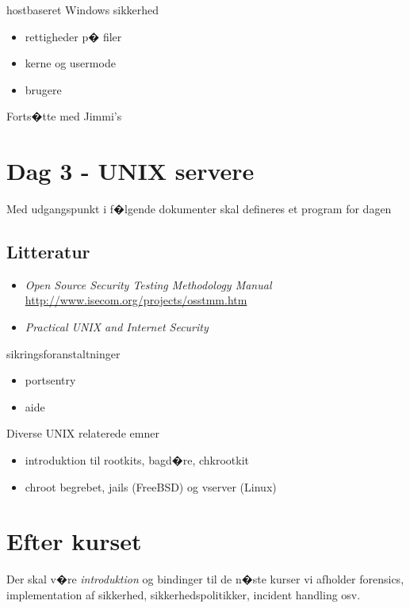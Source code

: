 \documentclass[a4paper,12pt]{article}
\newcommand{\link}[1]{\href{#1}{#1}}
\begin{document}
hostbaseret Windows sikkerhed
\begin{itemize}
\item rettigheder p� filer
\item kerne og usermode
\item brugere
\end{itemize}

Forts�tte med Jimmi's



\section{Dag 3 - UNIX servere}

Med udgangspunkt i f�lgende dokumenter skal defineres et program for
dagen
\subsection{Litteratur}
\begin{itemize}
\item
\emph{Open Source Security Testing Methodology Manual}\\
\link{http://www.isecom.org/projects/osstmm.htm}
\item \emph{Practical UNIX and Internet Security}
\end{itemize}

sikringsforanstaltninger
\begin{itemize}
\item portsentry
\item aide
\end{itemize}

Diverse UNIX relaterede emner
\begin{itemize}
\item introduktion til rootkits, bagd�re, chkrootkit
\item chroot begrebet, jails (FreeBSD) og vserver (Linux)
\end{itemize}

\section{Efter kurset}
Der skal v�re \emph{introduktion} og bindinger til de n�ste kurser vi
afholder forensics, implementation af sikkerhed, sikkerhedspolitikker,
incident handling osv.
\end{document}
